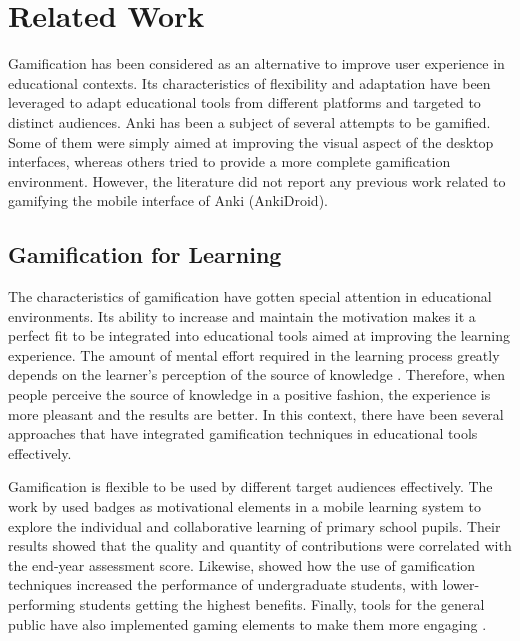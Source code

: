 
\chapter{Related Work} %

\label{rela} %


Gamification has been considered as an alternative to improve user experience in educational contexts. Its characteristics of flexibility and adaptation have been leveraged to adapt educational tools from different platforms and targeted to distinct audiences. Anki has been a subject of several attempts to be gamified. Some of them were simply aimed at improving the visual aspect of the desktop interfaces, whereas others tried to provide a more complete gamification environment. However, the literature did not report any previous work related to gamifying the mobile interface of Anki (AnkiDroid).

\section{Gamification for Learning}
The characteristics of gamification have gotten special attention in educational environments. Its ability to increase and maintain the motivation makes it a perfect fit to be integrated into educational tools aimed at improving the learning experience. The amount of mental effort required in the learning process greatly depends on the learner's perception of the source of knowledge \citep{salomon1983differential}. Therefore, when people perceive the source of knowledge in a positive fashion, the experience is more pleasant and the results are better. In this context, there have been several approaches that have integrated gamification techniques in educational tools effectively.

Gamification is flexible to be used by different target audiences effectively. The work by \citep{boticki2015usage} used badges as motivational elements in a mobile learning system to explore the individual and collaborative learning of primary school pupils. Their results showed that the quality and quantity of contributions were correlated with the end-year assessment score. Likewise, \citep{slish2015gamification} showed how the use of gamification techniques increased the performance of undergraduate students, with lower-performing students getting the highest benefits. Finally, tools for the general public have also implemented gaming elements to make them more engaging \citep{morrison2014khan}.

